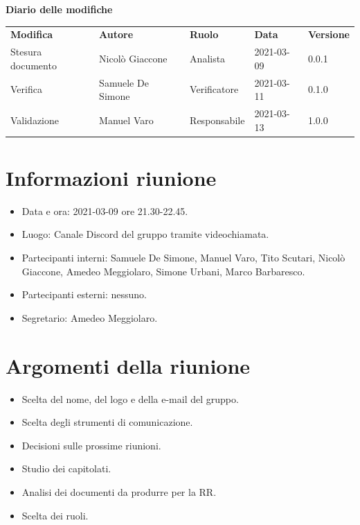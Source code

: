 \documentclass[a4paper]{article}
\begin{document}
    \begin{center}
        \textbf{\Large Diario delle modifiche}\\
        \vspace{10px}
        \begin{table}[h!]
        \centering
        \renewcommand{\arraystretch}{1.8}
        \begin{tabular}{p{150px} p{90px} p{70px} p{60px} p{45px}}
            \rowcolor{logo!70} \textbf{Modifica} & \textbf{Autore} & \textbf{Ruolo} & \textbf{Data} & \textbf{Versione}\\
            Stesura documento & Nicolò Giaccone & Analista & 2021-03-09 & 0.0.1\\   
            Verifica & Samuele De Simone & Verificatore & 2021-03-11 & 0.1.0\\
            Validazione & Manuel Varo & Responsabile & 2021-03-13 & 1.0.0
        \end{tabular}
    \end{table}
    \end{center}
    \newpage

    \tableofcontents
    \newpage
    
    \section{Informazioni riunione}
    \begin{itemize}
        \item Data e ora: 2021-03-09 ore 21.30-22.45.
        \item Luogo: Canale Discord del gruppo tramite videochiamata.
        \item Partecipanti interni: Samuele De Simone, Manuel Varo, Tito Scutari, Nicolò Giaccone, Amedeo Meggiolaro, Simone Urbani, Marco Barbaresco.
        \item Partecipanti esterni: nessuno.
        \item Segretario: Amedeo Meggiolaro.
    \end{itemize}
    \section{Argomenti della riunione}
    \begin{itemize}
        \item Scelta del nome, del logo e della e-mail del gruppo.
        \item Scelta degli strumenti di comunicazione.
        \item Decisioni sulle prossime riunioni.
        \item Studio dei capitolati.
        \item Analisi dei documenti da produrre per la RR.
        \item Scelta dei ruoli.
    \end{itemize}
\end{document}
